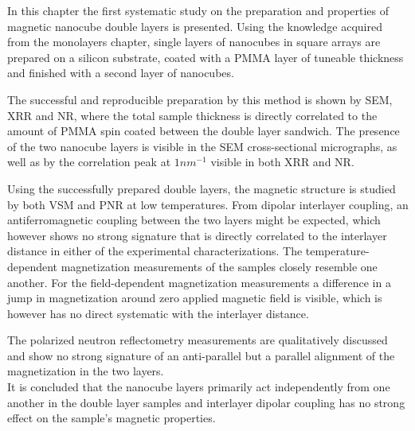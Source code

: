 \documentclass[\main/dresen_thesis.tex]{subfiles}
\begin{document}
  In this chapter the first systematic study on the preparation and properties of magnetic nanocube double layers is presented.
  Using the knowledge acquired from the monolayers chapter, single layers of nanocubes in square arrays are prepared on a silicon substrate, coated with a PMMA layer of tuneable thickness and finished with a second layer of nanocubes.

  The successful and reproducible preparation by this method is shown by SEM, XRR and NR, where the total sample thickness is directly correlated to the amount of PMMA spin coated between the double layer sandwich.
  The presence of the two nanocube layers is visible in the SEM cross-sectional micrographs, as well as by the correlation peak at $1 \unit{nm^{-1}}$ visible in both XRR and NR.

  Using the successfully prepared double layers, the magnetic structure is studied by both VSM and PNR at low temperatures.
  From dipolar interlayer coupling, an antiferromagnetic coupling between the two layers might be expected, which however shows no strong signature that is directly correlated to the interlayer distance in either of the experimental characterizations.
  The temperature-dependent magnetization measurements of the samples closely resemble one another.
  For the field-dependent magnetization measurements a difference in a jump in magnetization around zero applied magnetic field is visible, which is however has no direct systematic with the interlayer distance.

  The polarized neutron reflectometry measurements are qualitatively discussed and show no strong signature of an anti-parallel but a parallel alignment of the magnetization in the two layers.
  \\

  It is concluded that the nanocube layers primarily act independently from one another in the double layer samples and interlayer dipolar coupling has no strong effect on the sample's magnetic properties.
\end{document}
